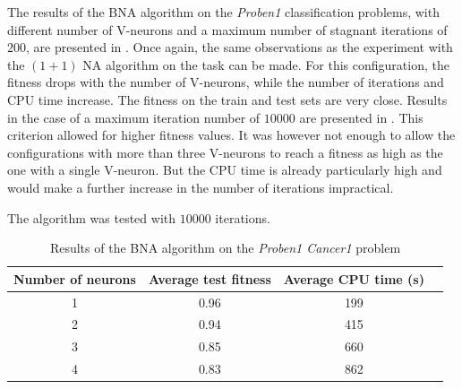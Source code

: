 The results of the BNA algorithm on the \textit{Proben1} classification problems, with different number of V-neurons and a maximum number of stagnant iterations of $200$, are presented
in . Once again, the same observations as the experiment with the $(1 + 1)$ NA algorithm on the task can be made. For this configuration,
the fitness drops with the number of V-neurons, while the number of iterations and CPU time increase. The fitness on the train and test sets are very close.
Results in the case of a maximum iteration number of $10000$ are presented in . This criterion allowed for higher fitness values. It was however not enough to allow
the configurations with more than three V-neurons to reach a fitness as high as the one with a single V-neuron. But the CPU time is already particularly high and would make
a further increase in the number of iterations impractical.

\begin{table}
    \caption{Results of the BNA algorithm on the \textit{Proben1 Cancer1} problem}{The algorithm was tested with $10000$ iterations.}
    \centering
    \label{tab:bna_proben1}
    \begin{tabular}{ |c|c|c|c| }
        \hline
        Number of neurons & Average test fitness & Average CPU time (s) \\
        \hline
        1 & 0.96 & 199 \\
        \hline
        2 & 0.94 & 415 \\
        \hline
        3 & 0.85 & 660 \\
        \hline
        4 & 0.83 & 862 \\
        \hline\hline
    \end{tabular}
\end{table}

